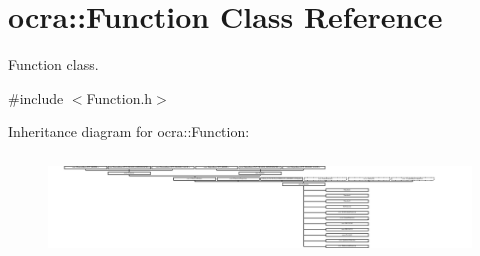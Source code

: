 \hypertarget{classocra_1_1Function}{}\section{ocra\+:\+:Function Class Reference}
\label{classocra_1_1Function}


Function class.  




{\ttfamily \#include $<$Function.\+h$>$}

Inheritance diagram for ocra\+:\+:Function\+:\begin{figure}[H]
\begin{center}
\leavevmode
\includegraphics[height=2.705314cm]{d2/d99/classocra_1_1Function}
\end{center}
\end{figure}
